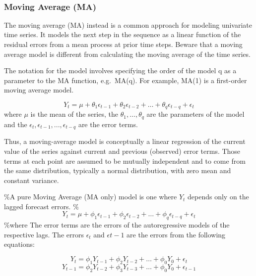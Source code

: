 \documentclass[11pt]{article}
\begin{document}
    \begin{center}
    \end{center}
    { \hspace*{\fill} \\}
    
    \hypertarget{moving-average-ma}{%
\subsubsection{Moving Average (MA)}\label{moving-average-ma}}

The moving average (MA) instead is a common approach for modeling
univariate time series. It models the next step in the sequence as a
linear function of the residual errors from a mean process at prior time
steps. Beware that a moving average model is different from calculating
the moving average of the time series.

The notation for the model involves specifying the order of the model q
as a parameter to the MA function, e.g.~MA(q). For example, MA(1) is a
first-order moving average model.

\[Y_t = \mu + \theta_1 \epsilon_{t-1} + \theta_2 \epsilon_{t-2} + \ldots + \theta_q \epsilon_{t-q} + \epsilon_t\]
where \(\mu\) is the mean of the series, the
\(\theta_1, \ldots, \theta_q\) are the parameters of the model and the
\(\epsilon_t, \epsilon_{t−1},..., \epsilon_{t−q}\) are the error terms.

Thus, a moving-average model is conceptually a linear regression of the
current value of the series against current and previous (observed)
error terms. Those terms at each point are assumed to be mutually
independent and to come from the same distribution, typically a normal
distribution, with zero mean and constant variance.

\%A pure Moving Average (MA only) model is one where \(Y_t\) depends
only on the lagged forecast errors.
\%\[Y_t = \mu + \phi_1 \epsilon_{t-1} + \phi_2 \epsilon_{t-2} + \ldots + \phi_q \epsilon_{t-q} + \epsilon_t\]
\%where The error terms are the errors of the autoregressive models of
the respective lags. The errors \(\epsilon_t\) and \(\epsilon{t-1}\) are
the errors from the following equations:

\[Y_t = \phi_1 Y_{t-1} + \phi_2 Y_{t-2} + \ldots + \phi_0 Y_{0} + \epsilon_t\]
\[Y_{t-1} = \phi_2 Y_{t-2} + \phi_3 Y_{t-3} + \ldots + \phi_0 Y_{0} + \epsilon_{t-1}\]
\end{document}
